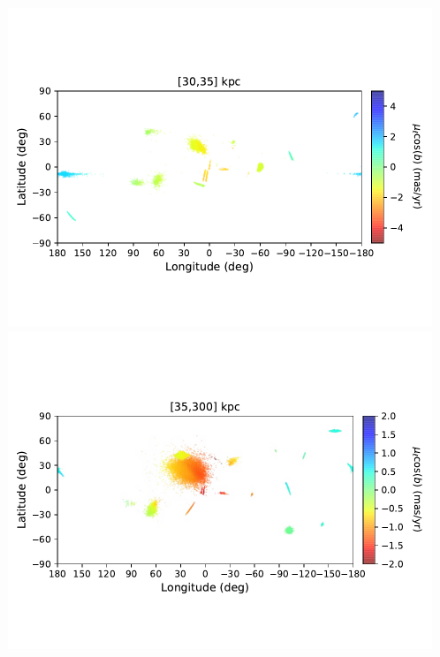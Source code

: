 \begin{figure}[h!]
\begin{center}
            \includegraphics[clip=true, trim = 0mm 20mm 0mm 20mm, width=0.9\columnwidth]{images/PII_ensemble_LB_D30-35_PML_new.pdf}
            \includegraphics[clip=true, trim = 0mm 20mm 0mm 20mm, width=0.9\columnwidth]{images/PII_ensemble_LB_D35-300_PML_new.pdf}


\end{center}
\end{figure}
